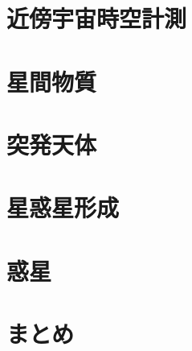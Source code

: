 \documentclass[a4j,twoside,11pt]{jreport}
\begin{document}
\chapter{近傍宇宙時空計測}\label{astrometry}




\chapter{星間物質}\label{ISM}








\chapter{突発天体}\label{transients}




\chapter{星惑星形成}\label{star-formation}








\chapter{惑星}\label{planets}








\chapter{まとめ}\label{conclusion}



\end{document}

